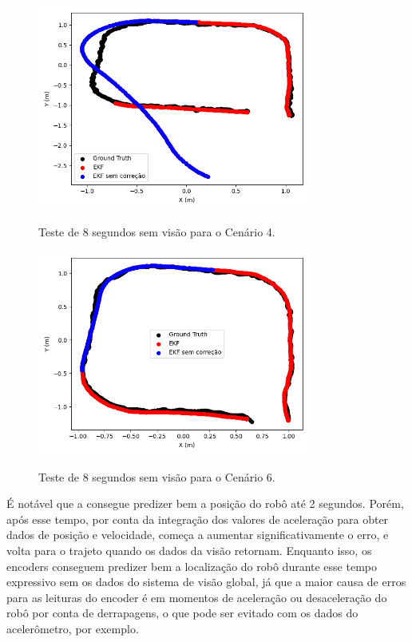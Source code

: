 \documentclass[acronym, symbols, table, deposito]{fei}
\begin{document}
		\begin{figure}[!htb]
			\centering
			\caption{Teste de 8 segundos sem visão para o Cenário 4.}
			\includegraphics[width=0.8\textwidth]{teste_imu_8s.png}
			\label{fig:teste_imu_8s}
		\end{figure}
		
		\begin{figure}[!htb]
			\centering
			\caption{Teste de 8 segundos sem visão para o Cenário 6.}
			\includegraphics[width=0.8\textwidth]{teste_encoder_8s.png}
			\label{fig:teste_encoder_8s}
		\end{figure}
	
		É notável que a  consegue predizer bem a posição do robô até 2 segundos. Porém, após esse tempo, por conta da integração dos valores de aceleração para obter dados de posição e velocidade, começa a aumentar significativamente o erro, e volta para o trajeto quando os dados da visão retornam. Enquanto isso, os encoders conseguem predizer bem a localização do robô durante esse tempo expressivo sem os dados do sistema de visão global, já que a maior causa de erros para as leituras do encoder é em momentos de aceleração ou desaceleração do robô por conta de derrapagens, o que pode ser evitado com os dados do acelerômetro, por exemplo.
		
\end{document}
